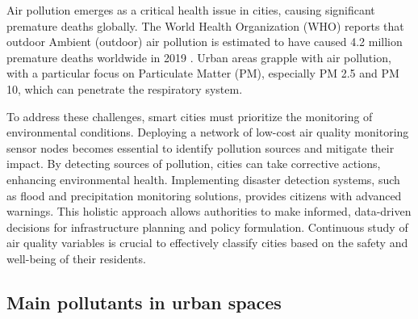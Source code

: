 Air pollution emerges as a critical health issue in cities, causing significant premature deaths globally. The World Health Organization (WHO) reports that outdoor Ambient (outdoor) air pollution is estimated to have caused 4.2 million premature deaths worldwide in 2019 \cite{WHO2018AirPollution}. Urban areas grapple with air pollution, with a particular focus on Particulate Matter (PM), especially PM 2.5 and PM 10, which can penetrate the respiratory system.

To address these challenges, smart cities must prioritize the monitoring of environmental conditions. Deploying a network of low-cost air quality monitoring sensor nodes becomes essential to identify pollution sources and mitigate their impact. By detecting sources of pollution, cities can take corrective actions, enhancing environmental health. Implementing disaster detection systems, such as flood and precipitation monitoring solutions, provides citizens with advanced warnings. This holistic approach allows authorities to make informed, data-driven decisions for infrastructure planning and policy formulation. Continuous study of air quality variables is crucial to effectively classify cities based on the safety and well-being of their residents.

\subsection{Main pollutants in urban spaces}

